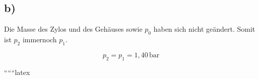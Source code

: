 

\subsection*{b)}

Die Masse des Zylos und des Gehäuses sowie $p_0$ haben sich nicht geändert. Somit ist $p_2$ immernoch $p_1$.

\[
p_2 = p_1 = 1,40 \, \text{bar}
\]

``````latex